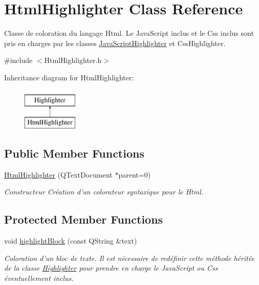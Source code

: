 \hypertarget{class_html_highlighter}{
\section{HtmlHighlighter Class Reference}
\label{class_html_highlighter}
}


Classe de coloration du langage Html. Le JavaScript inclus et le Css inclus sont pris en charges par les classes \hyperlink{class_java_script_highlighter}{JavaScriptHighlighter} et CssHighlighter.  




{\ttfamily \#include $<$HtmlHighlighter.h$>$}

Inheritance diagram for HtmlHighlighter:\begin{figure}[H]
\begin{center}
\leavevmode
\includegraphics[height=2.000000cm]{class_html_highlighter}
\end{center}
\end{figure}
\subsection*{Public Member Functions}
\begin{DoxyCompactItemize}
\item 
\hyperlink{class_html_highlighter_a817159b963470dfdded5f141f70886a6}{HtmlHighlighter} (QTextDocument $\ast$parent=0)
\begin{DoxyCompactList}\small\item\em Constructeur Création d'un colorateur syntaxique pour le Html. \item\end{DoxyCompactList}\end{DoxyCompactItemize}
\subsection*{Protected Member Functions}
\begin{DoxyCompactItemize}
\item 
void \hyperlink{class_html_highlighter_a81dd80f71c7644f84cdaaab76d8dbf3d}{highlightBlock} (const QString \&text)
\begin{DoxyCompactList}\small\item\em Coloration d'un bloc de texte. Il est nécessaire de redéfinir cette méthode héritée de la classe \hyperlink{class_highlighter}{Highlighter} pour prendre en charge le JavaScript ou Css éventuellement inclus. \item\end{DoxyCompactList}\end{DoxyCompactItemize}


